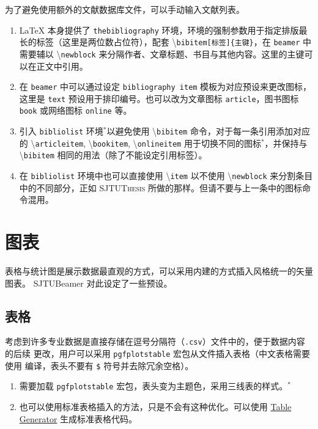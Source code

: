 \documentclass[
    UTF8,
    heading=true,
    12pt,
    a4paper
]{ctexrep}
\newenvironment{commentlist}
{\begin{enumerate}\small}
{\end{enumerate}}
\newcommand{\cmd}[1]{\textbackslash{}\texttt{#1}}
\newcommand{\cls}[1]{\texttt{#1}}
\newcommand{\env}[1]{\texttt{#1}}
\newcommand{\pkg}[1]{\texttt{#1}}
\newcommand{\opt}[1]{\texttt{#1}}
\def\themename{\textsf{SJTUBeamer}}
\begin{document}
为了避免使用额外的文献数据库文件，可以手动输入文献列表。


\begin{commentlist}
  \item \LaTeX{} 本身提供了 \env{thebibliography}
  环境，环境的强制参数用于指定排版最长的标签（这里是两位数占位符），配套
  \cmd{bibitem[标签]\{主键\}}，在 \cls{beamer} 中需要辅以
  \cmd{newblock}
  来分隔作者、文章标题、书目与其他内容。这里的主键可以在正文中引用。
  \item 在 \cls{beamer} 中可以通过设定 \opt{bibliography
    item}
  模板为对应预设来更改图标，这里是 \opt{text}
  预设用于排印编号。也可以改为文章图标 \opt{article}，图书图标
  \opt{book}
  或网络图标 \opt{online} 等。
  \item 引入 \env{bibliolist} 环境$^*$以避免使用
  \cmd{bibitem} 命令，对于每一条引用添加对应的
  \cmd{articleitem},
  \cmd{bookitem}, \cmd{onlineitem}
  用于切换不同的图标$^*$，并保持与 \cmd{bibitem}
  相同的用法（除了不能设定引用标签）。
  \item 在 \env{bibliolist} 环境中也可以直接使用 \cmd{item}
  以不使用 \cmd{newblock} 来分割条目中的不同部分，正如
  \textsc{SJTUThesis} 所做的那样。但请不要与上一条中的图标命令混用。
\end{commentlist}

\chapter{图表}

表格与统计图是展示数据最直观的方式，可以采用内建的方式插入风格统一的矢量图表。
\themename{} 对此设定了一些预设。

\section{表格}

考虑到许多专业数据是直接存储在逗号分隔符（\texttt{.csv}）文件中的，便于数据内容的后续
更改，用户可以采用 \pkg{pgfplotstable} 宏包从文件插入表格（中文表格需要使用
 编译，表头不要有 \texttt{\$} 符号并去除冗余空格）。


\begin{commentlist}
  \item 需要加载 \pkg{pgfplotstable}
  宏包，表头变为主题色，采用三线表的样式。$^*$
  \item 也可以使用标准表格插入的方法，只是不会有这种优化。可以使用
  \href{https://www.tablesgenerator.com/latex_tables}
  {Table Generator} 生成标准表格代码。
\end{commentlist}
\end{document}
